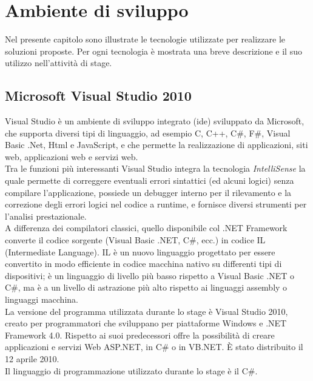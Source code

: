 
\chapter{Ambiente di sviluppo}
\label{cap:ambiente-sviluppo}

Nel presente capitolo sono illustrate le tecnologie utilizzate per realizzare le soluzioni proposte. Per ogni tecnologia è mostrata una breve descrizione e il suo utilizzo nell'attività di stage.
\section{Microsoft Visual Studio 2010}
Visual Studio è un ambiente di sviluppo integrato (\gls{ide}) sviluppato da Microsoft, che supporta diversi tipi di linguaggio, ad esempio C, C++, C\#, F\#, Visual Basic .Net, Html e JavaScript, e che permette la realizzazione di applicazioni, siti web, applicazioni web e servizi web.
\\
Tra le funzioni più interessanti Visual Studio integra la tecnologia \textit{IntelliSense} la quale permette di correggere eventuali errori sintattici (ed alcuni logici) senza compilare l'applicazione, possiede un debugger interno per il rilevamento e la correzione degli errori logici nel codice a runtime, e fornisce diversi strumenti per l'analisi prestazionale.
\\
A differenza dei compilatori classici, quello disponibile col .NET Framework converte il codice sorgente (Visual Basic .NET, C\#, ecc.) in codice IL (Intermediate Language).
IL è un nuovo linguaggio progettato per essere convertito in modo efficiente in codice macchina nativo su differenti tipi di dispositivi; è un linguaggio di livello più basso rispetto a Visual Basic .NET o C\#, ma è a un livello di astrazione più alto rispetto ai linguaggi assembly o linguaggi macchina.
\\
La versione del programma utilizzata durante lo stage è Visual Studio 2010, creato per programmatori che sviluppano per piattaforme Windows e .NET Framework 4.0. Rispetto ai suoi predecessori offre la possibilità di creare applicazioni e servizi Web ASP.NET, in C\# o in VB.NET. È stato distribuito il 12 aprile 2010. 
\\
Il linguaggio di programmazione utilizzato durante lo stage è il C\#.

